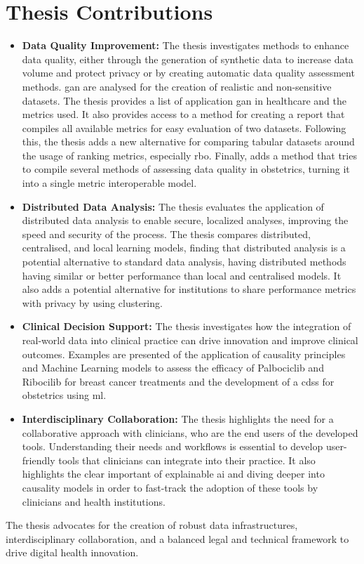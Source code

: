 \section{Thesis Contributions}

\begin{itemize}
    \item \textbf{Data Quality Improvement:} The thesis investigates methods to enhance data quality, either through the generation of synthetic data to increase data volume and protect privacy or by creating automatic data quality assessment methods. \acl{gan} are analysed for the creation of realistic and non-sensitive datasets. The thesis provides a list of application \acl{gan} in healthcare and the metrics used. It also provides access to a method for creating a report that compiles all available metrics for easy evaluation of two datasets. Following this, the thesis adds a new alternative for comparing tabular datasets around the usage of ranking metrics, especially \acl{rbo}. Finally, adds a method that tries to compile several methods of assessing data quality in obstetrics, turning it into a single metric interoperable model.  
    \item \textbf{Distributed Data Analysis:} The thesis evaluates the application of distributed data analysis to enable secure, localized analyses, improving the speed and security of the process. The thesis compares distributed, centralised, and local learning models, finding that distributed analysis is a potential alternative to standard data analysis, having distributed methods having similar or better performance than local and centralised models. It also adds a potential alternative for institutions to share performance metrics with privacy by using clustering.
    \item \textbf{Clinical Decision Support:} The thesis investigates how the integration of real-world data into clinical practice can drive innovation and improve clinical outcomes. Examples are presented of the application of causality principles and Machine Learning models to assess the efficacy of Palbociclib and Ribocilib for breast cancer treatments and the development of a  \acl{cdss} for obstetrics using \acl{ml}.
    \item \textbf{Interdisciplinary Collaboration:} The thesis highlights the need for a collaborative approach with clinicians, who are the end users of the developed tools. Understanding their needs and workflows is essential to develop user-friendly tools that clinicians can integrate into their practice. It also highlights the clear important of explainable \ac{ai} and diving deeper into causality models in order to fast-track the adoption of these tools by clinicians and health institutions.
\end{itemize}

The thesis advocates for the creation of robust data infrastructures, interdisciplinary collaboration, and a balanced legal and technical framework to drive digital health innovation.
